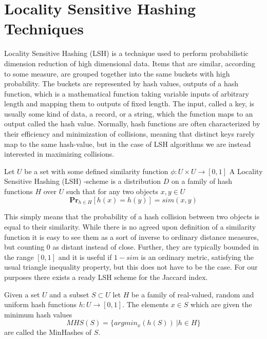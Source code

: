\documentclass[../main.tex]{subfiles}
\begin{document}
\section{Locality Sensitive Hashing Techniques}


Locality Sensitive Hashing (LSH) is a technique used to perform probabilistic dimension reduction of high dimensional data. Items that are similar, according to some measure, are grouped together into the same buckets with high probability. The buckets are represented by hash values, outputs of a hash function, which is a mathematical function taking variable inputs of arbitrary length and mapping them to outputs of fixed length. The input, called a key, is usually some kind of data, a record, or a string, which the function maps to an output called the hash value. Normally, hash functions are often characterized by their efficiency and minimization of collisions, meaning that distinct keys rarely map to the same hash-value, but in the case of LSH algorithms we are instead interested in maximizing collisions.


\begin{definition}
    Let $U$ be a set with some defined similarity function $\phi:U\times U\rightarrow [0,1]$ A Locality Sensitive Hashing (LSH) -scheme is a distribution $D$ on a family of hash functions $H$ over $U$ such that for any two objects $x,y\in U$
    $$\textbf{Pr}_{h\in H}[h(x) = h(y)] = sim(x,y)$$
\end{definition}

This simply means that the probability of a hash collision between two objects is equal to their similarity. While there is no agreed upon definition of a similarity function it is easy to see them as a sort of
inverse to ordinary distance measures, but counting 0 as distant instead of close. Further, they are typically bounded in the range $[0,1]$ and it is useful if $1 - sim$ is an ordinary metric, satisfying the usual triangle inequality property, but this does not have to be the case. For our purposes there exists a ready LSH scheme for the Jaccard index.

\begin{definition}[MinHash]
Given a set $U$ and a subset $S \subset U$ let $H$ be a family of real-valued, random and uniform hash functions $h:U\rightarrow [0,1]$. The elements $x\in S$ which are given the minimum hash values $$MHS(S) = \{argmin_x (h(S))\ | h \in H\}$$ are called the MinHashes of $S$.
\end{definition}
\end{document}
